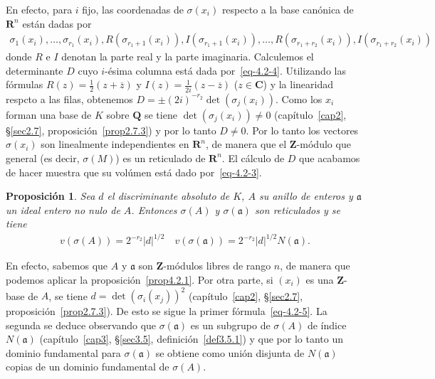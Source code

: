 \documentclass[bibtotoc,leqno,spanish]{amsbook}
\newcommand{\RR}{\mathbf{R}}
\newcommand{\QQ}{\mathbf{Q}}
\newcommand{\ZZ}{\mathbf{Z}}
\newcommand{\CC}{\mathbf{C}}
\newcommand{\idl}[1]{\mathfrak{#1}}
\newcommand{\oline}[1]{\overline{#1}}
\newcommand{\abs}[1]{\left\lvert#1\right\rvert}
\numberwithin{equation}{section}
\theoremstyle{note}
\theoremstyle{note}
\newtheorem{proposition}{Proposici\'on}
\theoremstyle{rem}
\numberwithin{theorem}{section}
\numberwithin{proposition}{section}
\numberwithin{definition}{section}
\numberwithin{lemma}{section}
\numberwithin{corollary}{section}
\numberwithin{example}{section}
\numberwithin{footnote}{section}%
\begin{document}
En efecto, para $i$ fijo, las coordenadas de $\sigma(x_{i})$ respecto a la base can\'onica de $\RR^{n}$ est\'an
dadas por
\begin{gather}\label{eq-4.2-4}
\sigma_{1}(x_{i}),\dots,\sigma_{r_{1}}(x_{i}),R(\sigma_{r_{1}+1}(x_{i})),I(\sigma_{r_{1}+1}(x_{i})),\dots,
R(\sigma_{r_{1}+r_{2}}(x_{i})),I(\sigma_{r_{1}+r_{2}}(x_{i}))
\end{gather}
donde $R$ e $I$ denotan la parte real y la parte imaginaria. Calculemos el determinante $D$ cuyo $i$-\'esima
columna est\'a dada por~\eqref{eq-4.2-4}. Utilizando las f\'ormulas $R(z) = \frac{1}{2}(z+\oline z)$ y
$I(z) = \frac{1}{2i}(z-\oline z)$ ($z\in\CC$) y la linearidad respcto a las filas, obtenemos $D = \pm (2i)^{-r_{2}}
\det(\sigma_{j}(x_{i}))$. Como los $x_{i}$ forman una base de $K$ sobre $\QQ$ se tiene $\det(\sigma_{j}(x_{i}))\neq 0$
(cap\'itulo~\ref{cap2}, \S\ref{sec2.7}, proposici\'on~\ref{prop2.7.3})
y por lo tanto $D\neq 0$. Por lo tanto los vectores $\sigma(x_{i})$ son linealmente
independientes en $\RR^{n}$, de manera que el $\ZZ$-m\'odulo que general (es decir, $\sigma(M)$) es un
reticulado de $\RR^{n}$. El c\'alculo de $D$ que acabamos de hacer muestra que su vol\'umen est\'a dado
por~\eqref{eq-4.2-3}.

\begin{proposition}\label{prop4.2.2}
Sea $d$ el discriminante absoluto de $K$, $A$ su anillo de enteros y $\idl{a}$ un ideal entero no nulo de $A$.
Entonces $\sigma(A)$ y $\sigma(\idl{a})$ son reticulados y se tiene
\begin{gather}\label{eq-4.2-5}
v(\sigma(A)) = 2^{-r_{2}}\abs{d}^{1/2}\quad v(\sigma(\idl{a})) = 2^{-r_{2}}\abs{d}^{1/2}N(\idl{a}).
\end{gather}
\end{proposition}

En efecto, sabemos que $A$ y $\idl{a}$ son $\ZZ$-m\'odulos libres de rango $n$, de manera que podemos aplicar
la proposici\'on~\ref{prop4.2.1}.
Por otra parte, si $(x_{i})$ es una $\ZZ$-base de $A$, se tiene
$d = \det(\sigma_{i}(x_{j}))^{2}$
(cap\'itulo~\ref{cap2}, \S\ref{sec2.7}, proposici\'on~\ref{prop2.7.3}).
De esto se sigue la primer f\'ormula~\eqref{eq-4.2-5}. La segunda se deduce observando que
$\sigma(\idl{a})$ es un subgrupo de $\sigma(A)$ de \'indice $N(\idl{a})$
(cap\'itulo~\ref{cap3}, \S\ref{sec3.5}, definici\'on~\ref{def3.5.1}) y que por
lo tanto un dominio fundamental para $\sigma(\idl{a})$ se obtiene como uni\'on disjunta de $N(\idl{a})$ copias
de un dominio fundamental de $\sigma(A)$.
\end{document}
